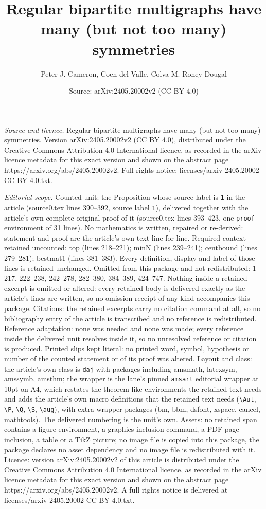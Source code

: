 \documentclass[10pt,a4paper]{amsart}
\title[Regular bipartite multigraphs have many (but not too many) s]{Regular bipartite multigraphs have many (but not too many) symmetries}
\author{Peter J. Cameron, Coen del Valle, Colva M. Roney-Dougal}
\date{Source: arXiv:2405.20002v2 (CC BY 4.0)}
\begin{document}
\maketitle

\noindent\emph{Source and licence.} Regular bipartite multigraphs have many (but not too many) symmetries. Version arXiv:2405.20002v2 (CC BY 4.0), distributed under the Creative Commons Attribution 4.0 International licence, as recorded in the arXiv licence metadata for this exact version and shown on the abstract page https://arxiv.org/abs/2405.20002v2. Full rights notice: licenses/arxiv-2405.20002-CC-BY-4.0.txt.\par\smallskip

\noindent\textit{Editorial scope.} Counted unit: the Proposition whose source label is \texttt{1} in the article (source0.tex lines 390--392, source label \texttt{1}), delivered together with the article's own complete original proof of it (source0.tex lines 393--423, one \texttt{proof} environment of 31 lines). No mathematics is written, repaired or re-derived: statement and proof are the article's own text line for line. Required context retained uncounted: top (lines 218--221); minN (lines 239--241); centbound (lines 279--281); bestmat1 (lines 381--383). Every definition, display and label of those lines is retained unchanged. Omitted from this package and not redistributed: 1--217, 222--238, 242--278, 282--380, 384--389, 424--747. Nothing inside a retained excerpt is omitted or altered: every retained body is delivered exactly as the article's lines are written, so no omission receipt of any kind accompanies this package. Citations: the retained excerpts carry no citation command at all, so no bibliography entry of the article is transcribed and no reference is redistributed. Reference adaptation: none was needed and none was made; every reference inside the delivered unit resolves inside it, so no unresolved reference or citation is produced. Printed slips kept literal: no printed word, symbol, hypothesis or number of the counted statement or of its proof was altered. Layout and class: the article's own class is \texttt{daj} with packages including amsmath, latexsym, amssymb, amsthm; the wrapper is the lane's pinned \texttt{amsart} editorial wrapper at 10pt on A4, which restates the theorem-like environments the retained text needs and adds the article's own macro definitions that the retained text needs (\texttt{\textbackslash Aut}, \texttt{\textbackslash P}, \texttt{\textbackslash Q}, \texttt{\textbackslash S}, \texttt{\textbackslash aug}), with extra wrapper packages (bm, bbm, dsfont, xspace, cancel, mathtools). The delivered numbering is the unit's own. Assets: no retained span contains a figure environment, a graphics-inclusion command, a PDF-page inclusion, a table or a TikZ picture; no image file is copied into this package, the package declares no asset dependency and no image file is redistributed with it. Licence: version arXiv:2405.20002v2 of this article is distributed under the Creative Commons Attribution 4.0 International licence, as recorded in the arXiv licence metadata for this exact version and shown on the abstract page https://arxiv.org/abs/2405.20002v2. A full rights notice is delivered at licenses/arxiv-2405.20002-CC-BY-4.0.txt. 
\end{document}

